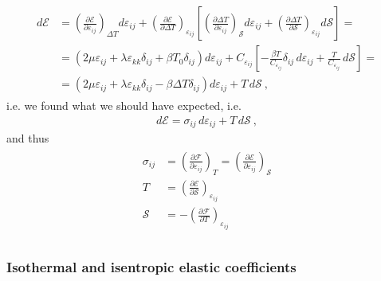 \documentclass[letterpaper,10pt,english]{jupyterBook}
\begin{document}
\begin{equation*}
\begin{split}\begin{aligned}
  d \mathcal{E} 
  & = \left( \frac{\partial \mathcal{E}}{\partial \varepsilon_{ij}} \right)_{\Delta T} d \varepsilon_{ij} + \left( \frac{\partial \mathcal{E}}{\partial \Delta T} \right)_{\varepsilon_{ij}} \left[ \left( \frac{\partial \Delta T}{\partial \varepsilon_{ij}} \right)_{\mathcal{S}} d \varepsilon_{ij} + \left( \frac{\partial \Delta T}{\partial \mathcal{S}} \right)_{\varepsilon_{ij}} d \mathcal{S} \right] = \\
  & = \left( 2 \mu \varepsilon_{ij} + \lambda \varepsilon_{kk} \delta_{ij} + \beta T_0 \delta_{ij} \right) d \varepsilon_{ij} + 
   C_{\varepsilon_{ij}} \left[ -\frac{\beta T}{C_{\varepsilon_{ij}}} \delta_{ij} \, d \varepsilon_{ij} + \frac{T}{C_{\varepsilon_{ij}}} \, d \mathcal{S} \right] = \\
  & = \left( 2 \mu \varepsilon_{ij} + \lambda \varepsilon_{kk} \delta_{ij} - \beta \Delta T \delta_{ij} \right) d \varepsilon_{ij} + T \, d \mathcal{S} \ ,
\end{aligned}\end{split}
\end{equation*}
\sphinxAtStartPar
i.e. we found what we should have expected, i.e.
\begin{equation*}
\begin{split}d \mathcal{E} = \sigma_{ij} \, d \varepsilon_{ij} + T \, d\mathcal{S} \ , \end{split}
\end{equation*}
\sphinxAtStartPar
and thus
\begin{equation*}
\begin{split}\begin{aligned}
\sigma_{ij}
 & = \left( \frac{\partial \mathcal{F}}{\partial \varepsilon_{ij}} \right)_{T}
   = \left( \frac{\partial \mathcal{E}}{\partial \varepsilon_{ij}} \right)_{\mathcal{S}} \\
 T & = \left( \frac{\partial \mathcal{E}}{\partial \mathcal{S}} \right)_{\varepsilon_{ij}}\\
 \mathcal{S} & = - \left( \frac{\partial \mathcal{F}}{\partial T} \right)_{\varepsilon_{ij}}\\
\end{aligned}\end{split}
\end{equation*}\subsubsection*{Isothermal and isentropic elastic coefficients}
\end{document}
